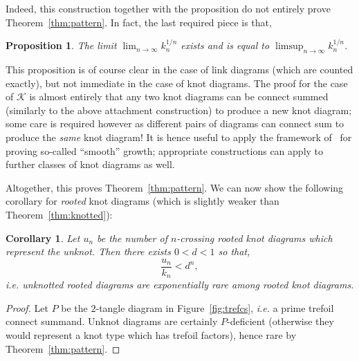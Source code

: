 \documentclass[submission%
]{dmtcs}
\newcommand{\KnotDiaClass}{\mathscr{K}}
\newcommand{\KnotDiaCard}{k}
\newtheorem{corollary}{Corollary}
\newtheorem{proposition}{Proposition}
\begin{document}
Indeed, this construction together with the proposition do not
entirely prove Theorem~\ref{thm:pattern}. In fact, the last required
piece is that,

\begin{proposition}
  The limit $\lim_{n\to\infty}{\KnotDiaCard_n^{1/n}}$ exists and is
  equal to $\limsup_{n\to\infty}{\KnotDiaCard_n^{1/n}}$.
\end{proposition}

This proposition is of course clear in the case of link diagrams
(which are counted exactly), but not immediate in the case of knot
diagrams. The proof for the case of $\KnotDiaClass$ is almost entirely
that any two knot diagrams can be connect summed (similarly to the
above attachment construction) to produce a new knot diagram; some
care is required however as different pairs of diagrams can connect
sum to produce the \emph{same} knot diagram! It is hence useful to
apply the framework of~\cite{Bender1992104} for proving so-called
``smooth'' growth; appropriate constructions can apply to further
classes of knot diagrams as well.

Altogether, this proves Theorem~\ref{thm:pattern}. We can now show the
following corollary for \emph{rooted} knot diagrams (which is slightly
weaker than Theorem~\ref{thm:knotted}):

\begin{corollary}
  \label{thm:rootknotted}
  Let $u_n$ be the number of $n$-crossing \emph{rooted} knot diagrams which
  represent the unknot. Then there exists $0< d < 1$ so that,
  \begin{displaymath}
    \frac{u_n}{k_n} < d^n,
  \end{displaymath}
  \textit{i.e.} unknotted \emph{rooted} diagrams are exponentially
  rare among \emph{rooted} knot diagrams.
\end{corollary}

\begin{proof}
  Let $P$ be the $2$-tangle diagram in Figure~\ref{fig:trefcs},
  \textit{i.e.} a prime trefoil connect summand. Unknot diagrams are
  certainly $P$-deficient (otherwise they would represent a knot type
  which has trefoil factors), hence rare by Theorem~\ref{thm:pattern}.
\end{proof}
\end{document}
